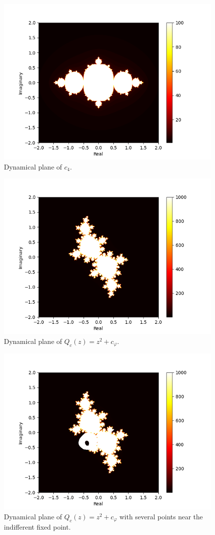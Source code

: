 \documentclass[11pt]{article}
\begin{document}
\begin{figure}[ht!]
    \centering
    \includegraphics{julia_set_-0.75_0.0.png}
    \caption{Dynamical plane of $c_4$.}
    \label{fig:1e}
\end{figure}

\begin{figure}[ht]
    \centering
    \includegraphics{siegel_1.png}
    \caption{Dynamical plane of $Q_c(z) = z^2 + c_{\varphi}$.}
    \label{fig:siegel_1}
\end{figure}

\begin{figure}[ht]
    \centering
    \includegraphics{siegel_2.png}
    \caption{Dynamical plane of $Q_c(z) = z^2 + c_{\varphi}$ with several points near the indifferent fixed point.}
    \label{fig:siegel_2}
\end{figure}
\end{document}
